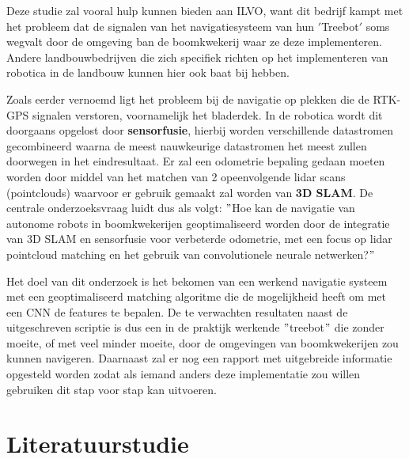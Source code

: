 Deze studie zal vooral hulp kunnen bieden aan ILVO, want dit bedrijf kampt met het probleem dat de signalen van het navigatiesysteem van hun \('\)Treebot\('\) soms wegvalt door de omgeving ban de boomkwekerij waar ze deze implementeren.
Andere landbouwbedrijven die zich specifiek richten op het implementeren van robotica in de landbouw kunnen hier ook baat bij hebben.\newline

Zoals eerder vernoemd ligt het probleem bij de navigatie op plekken die de RTK-GPS signalen verstoren, voornamelijk het bladerdek.
In de robotica wordt dit doorgaans opgelost door \textbf{sensorfusie}, hierbij worden verschillende datastromen gecombineerd waarna de meest nauwkeurige datastromen het meest zullen doorwegen in het eindresultaat.
Er zal een odometrie bepaling gedaan moeten worden door middel van het matchen van 2 opeenvolgende lidar scans (pointclouds) waarvoor er gebruik gemaakt zal worden van \textbf{3D SLAM}.
De centrale onderzoeksvraag luidt dus als volgt: \("\)Hoe kan de navigatie van autonome robots in boomkwekerijen geoptimaliseerd worden door de integratie van 3D SLAM en sensorfusie voor verbeterde odometrie, met een focus op lidar pointcloud matching en het gebruik van convolutionele neurale netwerken?\("\)\newline

Het doel van dit onderzoek is het bekomen van een werkend navigatie systeem met een geoptimaliseerd matching algoritme die de mogelijkheid heeft om met een CNN de features te bepalen.
De te verwachten resultaten naast de uitgeschreven scriptie is dus een in de praktijk werkende \("\)treebot\("\) die zonder moeite, of met veel minder moeite, door de omgevingen van boomkwekerijen zou kunnen navigeren.
Daarnaast zal er nog een rapport met uitgebreide informatie opgesteld worden zodat als iemand anders deze implementatie zou willen gebruiken dit stap voor stap kan uitvoeren.


\section{Literatuurstudie}%
\label{sec:Literatuurstudie}

